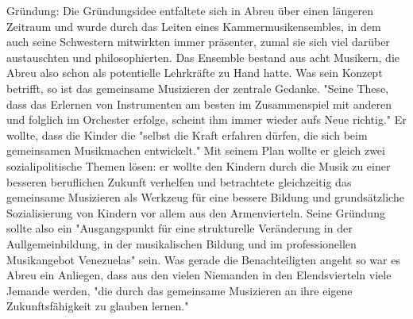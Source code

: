 Gründung: 
Die Gründungsidee entfaltete sich in Abreu über einen längeren Zeitraum und
wurde durch das Leiten eines Kammermusikensembles, in dem auch seine Schwestern
mitwirkten immer präsenter, zumal sie sich viel darüber austauschten und
philosophierten. Das Ensemble bestand aus acht Musikern, die Abreu also schon
als potentielle Lehrkräfte zu Hand hatte. \autocite[34]{kaufmann:el_sistema}
Was sein Konzept betrifft, so ist das gemeinsame Musizieren der zentrale
Gedanke. "Seine These, dass das Erlernen von Instrumenten am besten im
Zusammenspiel mit anderen und folglich im Orchester erfolge, scheint ihm immer
wieder aufs Neue richtig."\autocite[34]{kaufmann:el_sistema} Er wollte, dass die
Kinder die "selbst die Kraft erfahren dürfen, die sich beim gemeinsamen
Musikmachen entwickelt."\autocite[34]{kaufmann:el_sistema} Mit seinem Plan
wollte er gleich zwei sozialipolitische Themen lösen: er wollte den Kindern
durch die Musik zu einer besseren beruflichen Zukunft verhelfen und betrachtete
gleichzeitig das gemeinsame Musizieren als Werkzeug für eine bessere Bildung und
grundsätzliche Sozialisierung von Kindern vor allem aus den Armenvierteln. Seine
Gründung sollte also ein "Ausgangspunkt für eine strukturelle Veränderung in der
Aullgemeinbildung, in der musikalischen Bildung und im professionellen
Musikangebot Venezuelas" sein. \autocite[38]{kaufmann:el_sistema} Was gerade die
Benachteiligten angeht so war es Abreu ein Anliegen, dass aus den vielen
Niemanden in den Elendsvierteln viele Jemande werden, "die durch das gemeinsame
Musizieren an ihre eigene Zukunftsfähigkeit zu glauben lernen."\autocite[39]{kaufmann:el_sistema}

